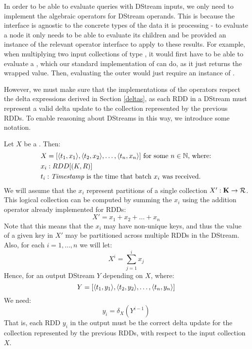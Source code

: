 In order to be able to evaluate queries with DStream inputs, we only need to implement the algebraic operators for DStream operands.  This is because the  interface is agnostic to the concrete types of the data it is processing - to evaluate a node it only needs to be able to evaluate its children and be provided an instance of the relevant operator interface to apply to these results. For example, when multiplying two input collections of type , it would first have to be able to evaluate a , which our standard implementation of  can do, as it just returns the wrapped value. Then, evaluating the outer  would just require an instance of .

However, we must make sure that the implementations of the operators respect the delta expressions derived in Section \ref{deltas}, as each RDD in a DStream must represent a valid delta update to the collection represented by the previous RDDs. To enable reasoning about DStreams in this way, we introduce some notation.
\par \noindent Let $X$ be a . Then:
\begin{equation*}
\begin{split}
&X = [\langle t_1, x_1 \rangle, \langle t_2, x_2 \rangle, \dots, \langle t_n, x_n \rangle] \textrm{ for some $n \in \mathbb{N}$, where:} \\
&x_i: RDD[(K,R)] \\
&t_i: \textrm{\textit{Timestamp}} \textrm{ is the time that batch $x_i$ was received.}
\end{split}
\end{equation*}
We will assume that the $x_i$ represent partitions of a single collection $X': \mathbf{K} \rightarrow \mathcal{R}$. This logical collection can be computed by summing the $x_i$ using the addition operator already implemented for RDDs:
\begin{equation*}
X' = x_1 + x_2 + \dots + x_n
\end{equation*}
Note that this means that the $x_i$ may have non-unique keys, and thus the value of a given key in $X'$ may be partitioned across multiple RDDs in the DStream.
\vs
Also, for each $i = 1, \dots, n$ we will let:
\begin{equation*}
X^i = \sum_{j = 1}^i{x_j}
\end{equation*}
Hence, for an output DStream $Y$ depending on $X$, where:
\begin{equation*}
Y = [\langle t_1, y_1 \rangle, \langle t_2, y_2 \rangle, \dots, \langle t_n, y_n \rangle]
\end{equation*}
We need:
\begin{equation*}
y_i = \delta_X(Y^{i-1})
\end{equation*}
That is, each RDD $y_i$ in the output must be the correct delta update for the collection represented by the previous RDDs, with respect to the input collection $X$.

